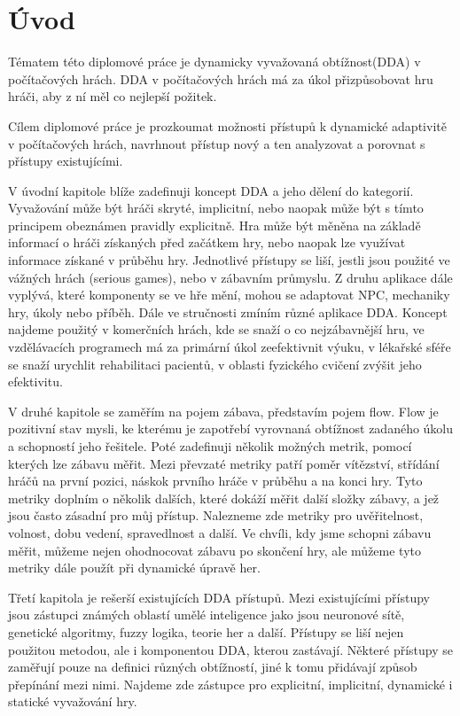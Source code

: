 \chapter{Úvod}

Tématem této diplomové práce je dynamicky vyvažovaná obtížnost(DDA) v počítačových hrách. DDA v počítačových hrách má za úkol přizpůsobovat hru hráči, aby z ní měl co nejlepší požitek. 

Cílem diplomové práce je prozkoumat možnosti přístupů k dynamické adaptivitě v počítačových hrách, navrhnout přístup nový a ten analyzovat a porovnat s přístupy existujícími.

V úvodní kapitole blíže zadefinuji koncept DDA a jeho dělení do kategorií. Vyvažování může být hráči skryté, implicitní, nebo naopak může být s tímto principem obeznámen pravidly explicitně. Hra může být měněna na základě informací o hráči získaných před začátkem hry, nebo naopak lze využívat informace získané v průběhu hry. Jednotlivé přístupy se liší, jestli jsou použité ve vážných hrách (serious games), nebo v zábavním průmyslu. Z druhu aplikace dále vyplývá, které komponenty se ve hře mění, mohou se adaptovat NPC, mechaniky hry, úkoly nebo příběh.
Dále ve stručnosti zmíním různé aplikace DDA. Koncept najdeme použitý v komerčních hrách, kde se snaží o co nejzábavnější hru, ve vzdělávacích programech má za primární úkol zeefektivnit výuku, v lékařské sféře se snaží urychlit rehabilitaci pacientů, v oblasti fyzického cvičení zvýšit jeho efektivitu.

V druhé kapitole se zaměřím na pojem zábava, představím pojem flow. Flow je pozitivní stav mysli, ke kterému je zapotřebí vyrovnaná obtížnost zadaného úkolu a schopností jeho řešitele. Poté zadefinuji několik možných metrik, pomocí kterých lze zábavu měřit. Mezi převzaté metriky patří poměr vítězství, střídání hráčů na první pozici, náskok prvního hráče v průběhu a na konci hry. Tyto metriky doplním o několik dalších, které dokáží měřit další složky zábavy, a jež jsou často zásadní pro můj přístup. Nalezneme zde metriky pro uvěřitelnost, volnost, dobu vedení, spravedlnost a další. Ve chvíli, kdy jsme schopni zábavu měřit, můžeme nejen ohodnocovat zábavu po skončení hry, ale můžeme tyto metriky dále použít při dynamické úpravě her. 

Třetí kapitola je rešerší existujících DDA přístupů. Mezi existujícími přístupy jsou zástupci známých oblastí umělé inteligence jako jsou neuronové sítě, genetické algoritmy, fuzzy logika, teorie her a další. Přístupy se liší nejen použitou metodou, ale i komponentou DDA, kterou zastávají. Některé přístupy se zaměřují pouze na definici různých obtížností, jiné k tomu přidávají způsob přepínání mezi nimi. Najdeme zde zástupce pro explicitní, implicitní, dynamické i statické vyvažování hry. 

